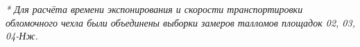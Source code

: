 \begin{table}[H]
\begin{center}
\begin{tabular}{ccccccc}
                          \bottomrule
 \end{tabular}
\end{center}
\textit{* Для расчёта времени экспонирования и скорости транспортировки обломочного чехла были объединены выборки замеров талломов площадок 02, 03, 04-Нж.}

 \end{table}
